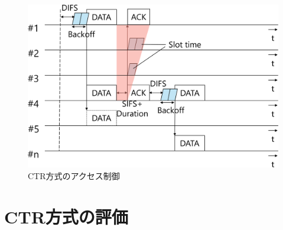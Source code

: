 \documentclass[a4paper,10pt]{ltjsarticle}
\begin{document}
\begin{figure}[H]
  \centering
  \includegraphics[width=\linewidth]{fig3.pdf} 
  \caption{CTR方式のアクセス制御}

\end{figure}
\section{CTR方式の評価}
\end{document}
